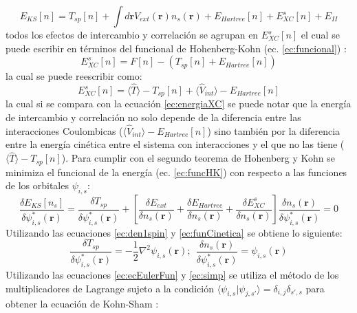 \documentclass[12pt,a4paper, oneside]{book}
\begin{document}
   \begin{equation}
   E_{KS}[n] = T_{sp}[n]+ \int d \pmb{r} V_{ext} (\pmb{r}) n_s (\pmb{r}) +E_{Hartree} [n] + E_{XC}^s [n] + E_{II} \label{ec:funcHK}
   \end{equation}
   todos los efectos de intercambio y correlaci\'on se agrupan en $E_{XC}^s [n]$ el cual se puede escribir en t\'erminos del funcional de Hohenberg-Kohn (ec. \ref{ec:funcional}) :
   \begin{equation}
   E_{XC}^s [n] = F[n]-(T_{sp} [n]+E_{Hartree}[n]) \label{ec:eXC2}
   \end{equation}
   la cual se puede reescribir como:
   \begin{equation}
   E_{XC}^s [n]= \langle \hat{T} \rangle - T_{sp} [n]+\langle \hat{V}_{int} \rangle-E_{Hartree} [n] \label{ec:Exc2}
   \end{equation}
   la cual si se compara con la ecuaci\'on \ref{ec:energiaXC} se puede notar que la energ\'ia de intercambio y correlaci\'on no solo depende de la diferencia entre las interacciones Coulombicas ($\langle \hat{V}_{int} \rangle-E_{Hartree}[n]$) sino tambi\'en por la diferencia entre la energ\'ia cin\'etica entre el sistema con interacciones y el que no las tiene ($ \langle \hat{T} \rangle - T_{sp} [n] $).
   \newline
   Para cumplir con el segundo teorema de Hohenberg y Kohn se minimiza el funcional de la energ\'ia (ec. \ref{ec:funcHK}) con respecto  a las funciones de los orbitales $\psi_{i,s } $: 
   \begin{equation}
   \frac{\delta E_{KS} [n_s]}{\delta \psi_{i,s } ^* (\pmb{r})}= \frac{\delta T_{sp} }{\delta \psi_{i,s } ^* (\pmb{r}) } + \left[\frac{\delta E_{ext}}{\delta n_s (\pmb{r})}+\frac{\delta E_{Hartree}}{\delta n_s (\pmb{r})}+  \frac{\delta E_{XC}^s}{\delta n_s (\pmb{r})}\right] \frac{\delta n_s (\pmb{r})}{\delta \psi_{i,s } ^* (\pmb{r})} =0 \label{ec:ecEulerFun}
   \end{equation}
   Utilizando las ecuaciones \ref{ec:den1spin} y \ref{ec:funCinetica} se obtiene lo siguiente:
   \begin{equation}
   \frac{\delta T_{sp} }{\delta \psi_{i,s } ^* (\pmb{r}) }= -\frac{1}{2} \nabla^2 \psi_{i,s } (\pmb{r}); ~~ \frac{\delta n_s (\pmb{r})}{\delta \psi_{i,s } ^* (\pmb{r})}= \psi_{i,s } (\pmb{r}) \label{ec:simp}
   \end{equation} 
   Utilizando las ecuaciones \ref{ec:ecEulerFun} y  \ref{ec:simp} se utiliza el m\'etodo de los multiplicadores de Lagrange  sujeto a la condici\'on $\langle \psi_{i,s} | \psi_{j,s'} \rangle =   \delta_{i,j}\delta_{s',s}$   para obtener la ecuaci\'on de Kohn-Sham  :
\end{document}
